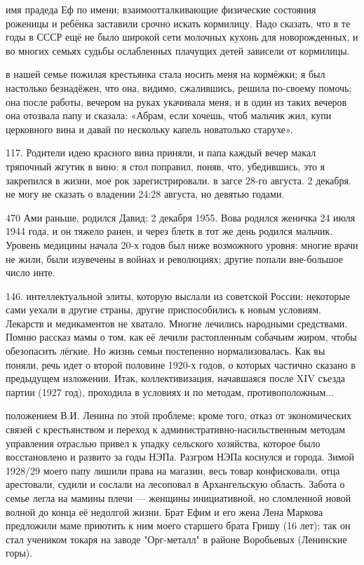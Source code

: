 имя прадеда
Еф по имени; взаимоотталкивающие физические состояния роженицы и ребёнка заставили срочно искать кормилицу. Надо сказать, что в те годы в СССР ещё не было широкой сети молочных кухонь для новорожденных, и во многих семьях судьбы ослабленных плачущих детей зависели от кормилицы.

в нашей семье пожилая крестьянка стала носить меня на кормёжки; я был настолько безнадёжен, что она, видимо, сжалившись, решила по-своему помочь; она после работы, вечером на руках укачивала меня, и в один из таких вечеров она отозвала папу и сказала: «Абрам, если хочешь, чтоб мальчик жил, купи церковного вина и давай по нескольку капель новатолько старухе».

117. Родители идею красного вина приняли, и папа каждый вечер макал тряпочный жгутик в вино: я стол поправил, поняв, что, убедившись, это я закрепился в жизни, мое рок зарегистрировали. в загсе 28-го августа. 2 декабря. не могу не сказать о владении 24:28 августа, но девятью годами.

470
Ами раньше, родился Давид: 2 декабря 1955. Вова родился женичка 24 июля 1944 года, и он тяжело ранен, и через блетк в тот же день родился мальчик.
Уровень медицины начала 20-х годов был ниже возможного уровня: многие врачи не жили, были изувечены в войнах и революциях; другие попали вне-большое число инте.

146.
интеллектуальной элиты, которую выслали из советской России; некоторые сами уехали в другие страны, другие приспособились к новым условиям. Лекарств и медикаментов не хватало. Многие лечились народными средствами. Помню рассказ мамы о том, как её лечили растопленным собачьим жиром, чтобы обезопасить лёгкие. Но жизнь семьи постепенно нормализовалась. Как вы поняли, речь идет о второй половине 1920-х годов, о которых частично сказано в предыдущем изложении.
Итак, коллективизация, начавшаяся после XIV съезда партии (1927 год), проходила в условиях и по методам, противоположным...

положением В.И. Ленина по этой проблеме; кроме того, отказ от экономических связей с крестьянством и переход к административно-насильственным методам управления отраслью привел к упадку сельского хозяйства, которое было восстановлено и развито за годы НЭПа. Разгром НЭПа коснулся и города. Зимой 1928/29 моего папу лишили права на магазин, весь товар конфисковали, отца арестовали, судили и сослали на лесоповал в Архангельскую область. Забота о семье легла на мамины плечи — женщины инициативной, но сломленной новой волной до конца её недолгой жизни. Брат Ефим и его жена Лена Маркова предложили маме приютить к ним моего старшего брата Гришу (16 лет); так он стал учеником токаря на заводе "Орг-металл" в районе Воробьевых (Ленинские горы).

